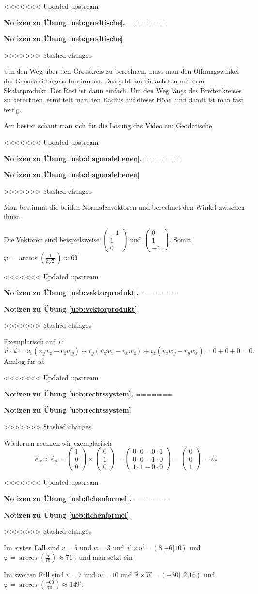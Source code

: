 \documentclass[%
11pt,%
twoside,%
titlepage,%
<<<<<<< Updated upstream
german,%
=======
swissgerman,%
>>>>>>> Stashed changes
headsepline%
]{scrartcl}
\newcommand{\faReturnGray}{\textcolor{gray}{\faMailReply}} %
\theoremstyle{definition}
\theoremstyle{plain}
\newcommand{\concatueb}[1]{ueb:#1}%
\newcommand{\concatlsg}[1]{lsg:#1}%
\newenvironment{lsg}[1]{%
<<<<<<< Updated upstream
    \par\noindent\textbf{Notizen zu Übung \ref{\concatueb{#1}}.}%
    \label{\concatlsg{#1}}
=======
    \par\noindent\textbf{Notizen zu Übung \ref{\concatueb{#1}}}\label{\concatlsg{#1}}
    \hfill\hyperref[\concatueb{#1}]{\faReturnGray}\par %
>>>>>>> Stashed changes
}{%
    \par%
}
\begin{document}
\begin{lsg}{geodtische}
Um den Weg über den Grosskreis zu berechnen, muss man den Öffnungswinkel des Grosskreisbogens bestimmen. Das geht am einfachsten mit dem Skalarprodukt. Der Rest ist dann einfach. Um den Weg längs des Breitenkreises zu berechnen, ermittelt man den Radius auf dieser \glqq Höhe\grqq\ und damit ist man fast fertig.

\begin{center}


\end{center}

Am besten schaut man sich für die Lösung das Video an: \href{https://www.youtube.com/watch?v=iEK3A2d_bnA}{Geodätische}
\end{lsg}

\begin{lsg}{diagonalebenen}
Man bestimmt die beiden Normalenvektoren und berechnet den Winkel zwischen ihnen.

Die Vektoren sind beispielsweise $\begin{pmatrix}
    -1\\1\\0
\end{pmatrix}$ und 
$\begin{pmatrix}
    0\\1\\-1
\end{pmatrix}$.
Somit $\varphi=\arccos(\frac{1}{2\sqrt{2}})\approx69^\circ$
\end{lsg}
\begin{lsg}{vektorprodukt}
Exemplarisch auf $\vec{v}$:
$$\vec{v}\cdot\vec{u}=v_x(v_yw_z-v_zw_y)+v_y(v_zw_x-v_xw_z)+v_z(v_xw_y-v_yw_x)=0+0+0=0.$$
Analog für $\vec{w}$.
\end{lsg}
\begin{lsg}{rechtssystem}
Wiederum rechnen wir exemplarisch $$\vec{e}_x\times\vec{e}_y=\begin{pmatrix}
    1\\0\\0
\end{pmatrix}\times\begin{pmatrix}
    0\\1\\0
\end{pmatrix}=\begin{pmatrix}
    0\cdot0-0\cdot1\\0\cdot0-1\cdot0\\1\cdot1-0\cdot0
\end{pmatrix}=\begin{pmatrix}
    0\\0\\1
\end{pmatrix}=\vec{e}_z$$
\end{lsg}
\begin{lsg}{flchenformel}
    Im ersten Fall sind $v=5$ und $w=3$ und $\vec{v}\times\vec{w}=(8|-6|10)$ und $\varphi=\arccos(\frac{5}{15})\approx71^\circ$; und man setzt ein \checkmark

    Im zweiten Fall sind $v=7$ und $w=10$ und $\vec{v}\times\vec{w}=(-30|12|16)$ und $\varphi=\arccos(\frac{-60}{70})\approx149^\circ$; \checkmark
\end{lsg}
\end{document}

